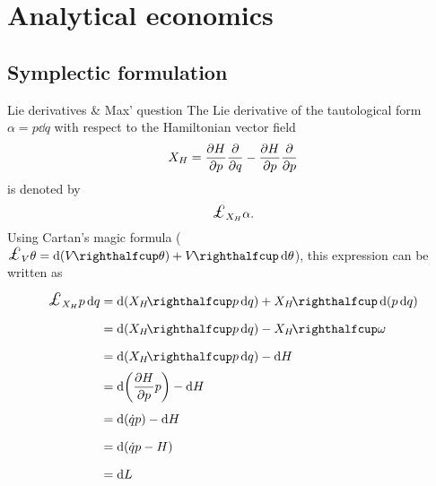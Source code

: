 \chapter{Analytical economics}

\section{Symplectic formulation}

\begin{aside}{Lie derivatives \& Max' question}
    The Lie derivative of the tautological form $\alpha = p\dd{q}$ with respect to the
    Hamiltonian vector field
    $$ X_H = \pdv{H}{p}\pdv{}{q} - \pdv{H}{p}\pdv{}{p}$$
    is denoted by
    $$ \lied{X_H}{\alpha}.$$
    Using Cartan's magic formula ($ \lied{V}{\theta} = \dd{(\intpr{V}{\theta})} + \intpr{V}{\dd{\theta}}$), this expression
    can be written as
    \begin{equation*} 
        \begin{split}
            \lied{X_H}{p\dd{q}} &= \dd{(\intpr{X_H}{p\dd{q}})} + \intpr{X_H}{\dd{(p\dd{q})}} \\
                                &= \dd{(\intpr{X_H}{p\dd{q}})} - \intpr{X_H}{\omega} \\
                                &= \dd{(\intpr{X_H}{p\dd{q}})} - \dd{H} \\
                                &= \dd{\qty(\pdv{H}{p}p)} - \dd{H} \\
                                &= \dd{(\dot{q}p)} - \dd{H} \\
                                &= \dd{(\dot{q}p - H)} \\
                                &= \dd{L} \\
        \end{split}
    \end{equation*}


\end{aside}
